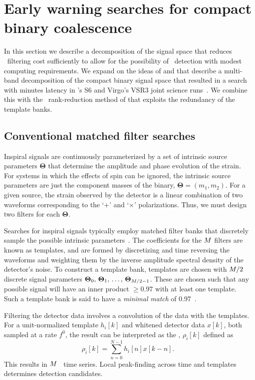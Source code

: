 \section{Early warning searches for compact binary coalescence}
\label{sec:method}

In this section we describe a decomposition of the \CBC{} signal space that
reduces \TD\ filtering cost sufficiently to allow for the
possibility of \earlywarning\ detection with modest computing requirements.  We
expand on the ideas of \citet{Marion2004} and \citet{Buskulic2010} that describe a
multi-band decomposition of the compact binary signal space that resulted in
a search with minutes latency in \LIGO{}'s S6 and Virgo's VSR3 joint science
runs~\citep{HugheyGWPAW2011}.  We combine this with the \SVD\ rank-reduction
method of \citet{Cannon:2010p10398} that exploits the redundancy of
the template banks.

\subsection{Conventional \CBC{} matched filter searches}

Inspiral signals are continuously parameterized by a set of intrinsic source
parameters $\mathbf\Theta$ that determine the amplitude and phase evolution of the
\GW{} strain. For systems in which the effects of spin can be ignored, the intrinsic
source parameters are just the component masses of the binary,
 $\mathbf\Theta = (m_1, m_2)$. For a given source, the strain observed by the
 detector is a linear combination of two waveforms corresponding to the
`$+$' and `$\times$' \GW{} polarizations.  Thus, we must design two filters
for each $\mathbf\Theta$.

Searches for inspiral signals typically employ matched filter
banks that discretely sample the possible intrinsic parameters~\citep{findchirppaper}.
The coefficients for the $M$ filters are known as templates, 
and are formed by discretizing and time reversing the
waveforms and weighting them by the inverse amplitude spectral density of the
detector's noise.
To construct a template bank, templates are chosen with
$M/2$ discrete signal parameters $\mathbf\Theta_0,\, \mathbf\Theta_1,\, \dots,\,
\mathbf\Theta_{M/2-1}$. These are chosen such that any possible signal
will have an inner product $\geqslant$0.97 with at least one template.
Such a template bank is said to have a {\em minimal match} of 0.97~\citep{Owen:1998dk}.

Filtering the detector data involves a convolution of the data with the
templates.  For a unit-normalized template $h_i[k]$ and whitened detector data
$x[k]$, both sampled at a rate $f^0$, the result can be interpreted as the
\SNR{}, $\rho_i[k]$ defined as
%
%
\begin{equation}
	\label{eq:SNRTD}
	\rho_i [k] = \sum_{n=0}^{N-1} h_{i}[n] x [k-n].
\end{equation}
This results in $M$ \SNR\ time series. Local peak-finding across time and
templates determines detection candidates.

